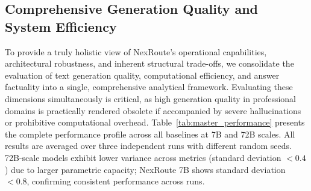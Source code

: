 \documentclass[a4paper,fleql]{cas-sc}
\begin{document}
\subsection{Comprehensive Generation Quality and System Efficiency}
\label{ssec:comprehensive}
To provide a truly holistic view of NexRoute's operational capabilities,
architectural robustness, and inherent structural trade-offs, we consolidate
the evaluation of text generation quality, computational efficiency, and answer
factuality into a single, comprehensive analytical framework. Evaluating these
dimensions simultaneously is critical, as high generation quality in
professional domains is practically rendered obsolete if accompanied by severe
hallucinations or prohibitive computational overhead.
Table~\ref{tab:master_performance} presents the complete performance profile
across all baselines at 7B and 72B scales. All results are averaged over
three independent runs with different random seeds. 72B-scale models exhibit
lower variance across metrics (standard deviation $< 0.4$) due to larger
parametric capacity; NexRoute 7B shows standard deviation $< 0.8$, confirming
consistent performance across runs.
\end{document}
